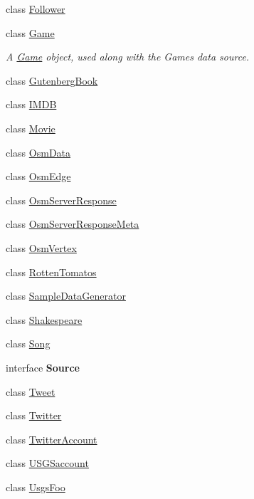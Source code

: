\begin{DoxyCompactItemize}
class \hyperlink{classbridges_1_1data__src__dependent_1_1_follower}{Follower}
\item 
class \hyperlink{classbridges_1_1data__src__dependent_1_1_game}{Game}
\begin{DoxyCompactList}\small\item\em A \hyperlink{classbridges_1_1data__src__dependent_1_1_game}{Game} object, used along with the Games data source. \end{DoxyCompactList}\item 
class \hyperlink{classbridges_1_1data__src__dependent_1_1_gutenberg_book}{Gutenberg\+Book}
\item 
class \hyperlink{classbridges_1_1data__src__dependent_1_1_i_m_d_b}{I\+M\+DB}
\item 
class \hyperlink{classbridges_1_1data__src__dependent_1_1_movie}{Movie}
\item 
class \hyperlink{classbridges_1_1data__src__dependent_1_1_osm_data}{Osm\+Data}
\item 
class \hyperlink{classbridges_1_1data__src__dependent_1_1_osm_edge}{Osm\+Edge}
\item 
class \hyperlink{classbridges_1_1data__src__dependent_1_1_osm_server_response}{Osm\+Server\+Response}
\item 
class \hyperlink{classbridges_1_1data__src__dependent_1_1_osm_server_response_meta}{Osm\+Server\+Response\+Meta}
\item 
class \hyperlink{classbridges_1_1data__src__dependent_1_1_osm_vertex}{Osm\+Vertex}
\item 
class \hyperlink{classbridges_1_1data__src__dependent_1_1_rotten_tomatos}{Rotten\+Tomatos}
\item 
class \hyperlink{classbridges_1_1data__src__dependent_1_1_sample_data_generator}{Sample\+Data\+Generator}
\item 
class \hyperlink{classbridges_1_1data__src__dependent_1_1_shakespeare}{Shakespeare}
\item 
class \hyperlink{classbridges_1_1data__src__dependent_1_1_song}{Song}
\item 
interface {\bfseries Source}
\item 
class \hyperlink{classbridges_1_1data__src__dependent_1_1_tweet}{Tweet}
\item 
class \hyperlink{classbridges_1_1data__src__dependent_1_1_twitter}{Twitter}
\item 
class \hyperlink{classbridges_1_1data__src__dependent_1_1_twitter_account}{Twitter\+Account}
\item 
class \hyperlink{classbridges_1_1data__src__dependent_1_1_u_s_g_saccount}{U\+S\+G\+Saccount}
\item 
class \hyperlink{classbridges_1_1data__src__dependent_1_1_usgs_foo}{Usgs\+Foo}
\end{DoxyCompactItemize}
